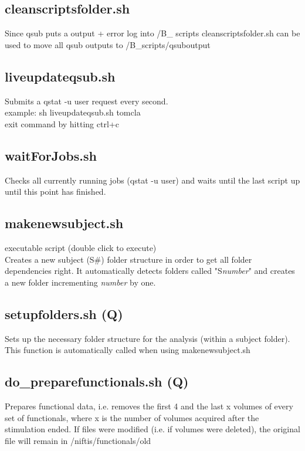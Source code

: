 \documentclass[12pt,a4paper]{scrartcl}
\begin{document}
\subsection{cleanscriptsfolder.sh}
Since qsub puts a output + error log into /B\_ scripts cleanscriptsfolder.sh can be used to move all qsub outputs to /B\_scripts/qsuboutput\\

\subsection{liveupdateqsub.sh}
Submits a qstat -u user request every second.\\

example: sh liveupdateqsub.sh tomcla\\

\noindent exit command by hitting ctrl+c

\subsection{waitForJobs.sh}
Checks all currently running jobs (qstat -u user) and waits until the last script up until this point has finished.

\subsection{makenewsubject.sh}
executable script (double click to execute)\\

Creates a new subject (S\#) folder structure in order to get all folder dependencies right. It automatically detects folders called "S\textit{number}" and creates a new folder incrementing \textit{number} by one.

\subsection{setupfolders.sh (Q)}
Sets up the necessary folder structure for the analysis (within a subject folder). This function is automatically called when using makenewsubject.sh\\

\subsection{do\_preparefunctionals.sh (Q)}
\label{sec:prepfct}
Prepares functional data, i.e. removes the first 4 and the last x volumes of every set of functionals, where x is the number of volumes acquired after the stimulation ended. If files were modified (i.e. if volumes were deleted), the original file will remain in /niftis/functionals/old\\
\end{document}
